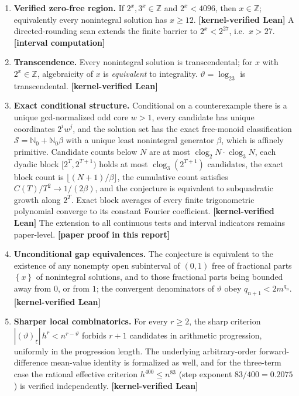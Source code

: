 \documentclass[11pt,oneside]{article}
\theoremstyle{definition}
\theoremstyle{remark}
\newcommand{\Nzero}{\mathbb N_0}
\newcommand{\Z}{\mathbb Z}
\newcommand{\thetaq}{\vartheta}
\newcommand{\Sol}{\mathcal S}
\newcommand{\fract}[1]{\left\{#1\right\}}
\newcommand{\fall}[2]{\left(#1\right)_{\!\underline{#2}}}
\newcommand{\clog}{\operatorname{clog}}
\newcommand{\statuslean}{\textcolor{leanblue}{\textbf{[kernel-verified Lean]}}}
\newcommand{\statusnew}{\textcolor{newgreen}{\textbf{[paper proof in this report]}}}
\newcommand{\statuscomp}{\textcolor{computeviolet}{\textbf{[interval computation]}}}
\begin{document}
\begin{enumerate}
\item \textbf{Verified zero-free region.}  If $2^x,3^x\in\Z$ and $2^x<4096$, then $x\in\Z$;
equivalently every nonintegral solution has $x\ge12$.  \statuslean{}  A directed-rounding
scan extends the finite barrier to $2^x<2^{27}$, i.e.\ $x>27$.  \statuscomp

\item \textbf{Transcendence.}  Every nonintegral solution is transcendental; for $x$ with
$2^x\in\Z$, algebraicity of $x$ is \emph{equivalent} to integrality.  $\thetaq=\log_23$ is
transcendental.  \statuslean

\item \textbf{Exact conditional structure.}  Conditional on a counterexample there is a unique
gcd-normalized odd core $w>1$, every candidate has unique coordinates $2^iw^j$, and the
solution set has the exact free-monoid classification $\Sol=\Nzero+\Nzero\beta$ with a unique
least nonintegral generator $\beta$, which is affinely primitive.  Candidate counts below $N$
are at most $\clog_2N\cdot\clog_3N$, each dyadic block $[2^T,2^{T+1})$ holds at most
$\clog_3(2^{T+1})$ candidates, the exact block count is $\lfloor(N+1)/\beta\rfloor$, the
cumulative count satisfies $C(T)/T^2\to1/(2\beta)$, and the conjecture is equivalent to
subquadratic growth along $2^T$.  Exact block averages of every finite trigonometric
polynomial converge to its constant Fourier coefficient.  \statuslean{}  The extension to all
continuous tests and interval indicators remains paper-level.  \statusnew

\item \textbf{Unconditional gap equivalences.}  The conjecture is equivalent to the existence
of any nonempty open subinterval of $(0,1)$ free of fractional parts $\fract{x}$ of
nonintegral solutions, and to those fractional parts being bounded away from $0$, or from
$1$; the convergent denominators of $\thetaq$ obey $q_{n+1}<2m^{q_n}$.  \statuslean

\item \textbf{Sharper local combinatorics.}  For every $r\ge2$, the sharp criterion
$|\fall{\thetaq}{r}|\,h^r<n^{r-\thetaq}$ forbids $r+1$ candidates in arithmetic progression,
uniformly in the progression length.  The underlying arbitrary-order forward-difference
mean-value identity is formalized as well, and for the three-term case the rational effective
criterion $h^{400}\le n^{83}$ (step exponent $83/400=0.2075$) is verified independently.
\statuslean


\end{enumerate}
\end{document}

